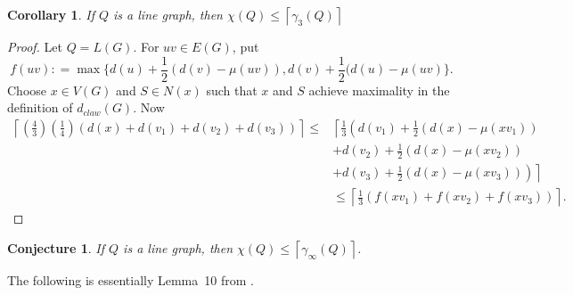 \documentclass[12pt]{amsart}
\theoremstyle{plain}
\newtheorem{conj}[thm]{Conjecture}
\newtheorem{cor}[thm]{Corollary}
\theoremstyle{definition}
\theoremstyle{remark}
\newcommand{\ceil}[1]{\left\lceil#1\right\rceil}
\newcommand{\parens}[1]{\left( #1 \right)}
\newcommand{\DefinedAs}{\mathrel{\mathop:}=}
\begin{document}
\begin{cor}\label{SuperDuperLocalReed}
If $Q$ is a line graph, then $\chi(Q) \le \ceil{\gamma_3(Q)}$
\end{cor}
\begin{proof}
Let $Q = L(G)$. For $uv\in E(G)$, put 
\[f(uv) \DefinedAs \max\{d(u)+\frac12(d(v)-\mu(uv)),d(v)+\frac12(d(u)-\mu(uv)\}.\]
Choose $x\in V(G)$ and $S\in N(x)$ such that $x$ and $S$ achieve maximality in the definition of $d_{claw}(G)$.
Now 
\begin{align*}
\ceil{\parens{\frac43}\parens{\frac14}\parens{d(x)+d(v_1)+d(v_2)+d(v_3)}} \le&
\left\lceil\frac13\left( 
d(v_1)+\frac12(d(x)-\mu(xv_1))\right.\right.\\
&+d(v_2)+\frac12(d(x)-\mu(xv_2))\\
&\left.\left.+d(v_3)+\frac12(d(x)-\mu(xv_3))\right)\right\rceil\\
&\le \ceil{\frac13(f(xv_1)+f(xv_2)+f(xv_3))}.
\end{align*}
\end{proof}

\begin{conj}\label{SuperDuperDuperLocalReed}
If $Q$ is a line graph, then $\chi(Q) \le \ceil{\gamma_\infty(Q)}$.
\end{conj}

The following is essentially Lemma~10 from \cite{CKPS}.
\end{document}
